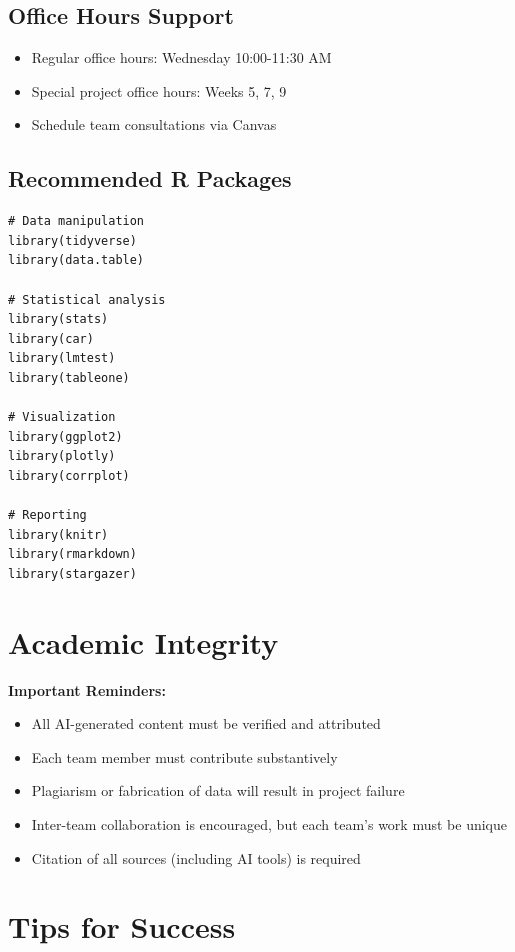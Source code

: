 \documentclass[11pt]{article}
\begin{document}
\subsection{Office Hours Support}
\begin{itemize}
\item Regular office hours: Wednesday 10:00-11:30 AM
\item Special project office hours: Weeks 5, 7, 9
\item Schedule team consultations via Canvas
\end{itemize}

\subsection{Recommended R Packages}
\begin{verbatim}
# Data manipulation
library(tidyverse)
library(data.table)

# Statistical analysis
library(stats)
library(car)
library(lmtest)
library(tableone)

# Visualization
library(ggplot2)
library(plotly)
library(corrplot)

# Reporting
library(knitr)
library(rmarkdown)
library(stargazer)
\end{verbatim}

\section{Academic Integrity}

\begin{tcolorbox}[colback=red!5,colframe=red,boxrule=1pt,arc=2pt,left=6pt,right=6pt,top=6pt,bottom=6pt]
\textbf{Important Reminders:}
\begin{itemize}
\item All AI-generated content must be verified and attributed
\item Each team member must contribute substantively
\item Plagiarism or fabrication of data will result in project failure
\item Inter-team collaboration is encouraged, but each team's work must be unique
\item Citation of all sources (including AI tools) is required
\end{itemize}
\end{tcolorbox}

\section{Tips for Success}
\end{document}
